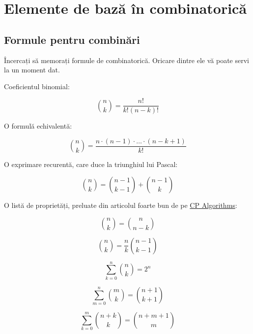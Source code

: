\documentclass[../main.tex]{subfiles}
\begin{document}
\chapter{Elemente de bază în combinatorică}

\section{Formule pentru combinări}

Încercați să memorați formule de combinatorică. Oricare dintre ele vă poate servi la un moment dat.

Coeficientul binomial:

\begin{equation}
  \binom{n}{k} = \frac{n!}{k!(n - k)!}
\end{equation}

O formulă echivalentă:

\begin{equation}
  \label{eq:comb-reduced}
  \binom{n}{k} = \frac{n \cdot (n-1) \cdot \dots \cdot (n - k + 1)}{k!}
\end{equation}

O exprimare recurentă, care duce la triunghiul lui Pascal:

\begin{equation}
  \binom{n}{k} = \binom{n - 1}{k - 1} + \binom{n - 1}{k}
\end{equation}

O listă de proprietăți, preluate din articolul foarte bun de pe \href{https://cp-algorithms.com/combinatorics/binomial-coefficients.html}{CP Algorithms}:

\begin{equation}
  \binom{n}{k} = \binom{n}{n - k}
\end{equation}

\begin{equation}
  \binom{n}{k} = \frac{n}{k} \binom{n - 1}{k - 1}
\end{equation}

\begin{equation}
  \sum_{k=0}^{n} \binom{n}{k} = 2^{n}
\end{equation}

\begin{equation}
  \sum_{m=0}^{n} \binom{m}{k} = \binom{n + 1}{k + 1}
\end{equation}

\begin{equation}
  \label{eq:comb-sum-3}
  \sum_{k=0}^{m} \binom{n + k}{k} = \binom{n + m + 1}{m}
\end{equation}
\end{document}
